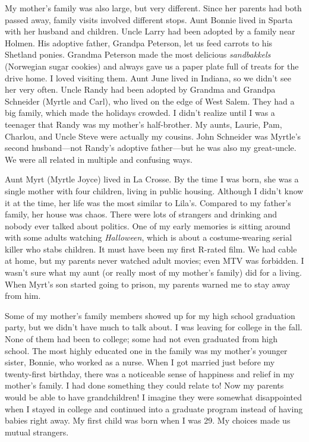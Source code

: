 \documentclass[
  letterpaper,
]{book}
\begin{document}
My mother's family was also large, but very different. Since her parents
had both passed away, family visits involved different stops. Aunt
Bonnie lived in Sparta with her husband and children. Uncle Larry had
been adopted by a family near Holmen. His adoptive father, Grandpa
Peterson, let us feed carrots to his Shetland ponies. Grandma Peterson
made the most delicious \emph{sandbakkels} (Norwegian sugar cookies) and
always gave us a paper plate full of treats for the drive home. I loved
visiting them. Aunt June lived in Indiana, so we didn't see her very
often. Uncle Randy had been adopted by Grandma and Grandpa Schneider
(Myrtle and Carl), who lived on the edge of West Salem. They had a big
family, which made the holidays crowded. I didn't realize until I was a
teenager that Randy was my mother's half-brother. My aunts, Laurie, Pam,
Charlou, and Uncle Steve were actually my cousins. John Schneider was
Myrtle's second husband---not Randy's adoptive father---but he was also
my great-uncle. We were all related in multiple and confusing ways.

Aunt Myrt (Myrtle Joyce) lived in La Crosse. By the time I was born, she
was a single mother with four children, living in public housing.
Although I didn't know it at the time, her life was the most similar to
Lila's. Compared to my father's family, her house was chaos. There were
lots of strangers and drinking and nobody ever talked about politics.
One of my early memories is sitting around with some adults watching
\emph{Halloween}, which is about a costume-wearing serial killer who
stabs children. It must have been my first R-rated film. We had cable at
home, but my parents never watched adult movies; even MTV was forbidden.
I wasn't sure what my aunt (or really most of my mother's family) did
for a living. When Myrt's son started going to prison, my parents warned
me to stay away from him.

Some of my mother's family members showed up for my high school
graduation party, but we didn't have much to talk about. I was leaving
for college in the fall. None of them had been to college; some had not
even graduated from high school. The most highly educated one in the
family was my mother's younger sister, Bonnie, who worked as a nurse.
When I got married just before my twenty-first birthday, there was a
noticeable sense of happiness and relief in my mother's family. I had
done something they could relate to! Now my parents would be able to
have grandchildren! I imagine they were somewhat disappointed when I
stayed in college and continued into a graduate program instead of
having babies right away. My first child was born when I was 29. My
choices made us mutual strangers.
\end{document}

